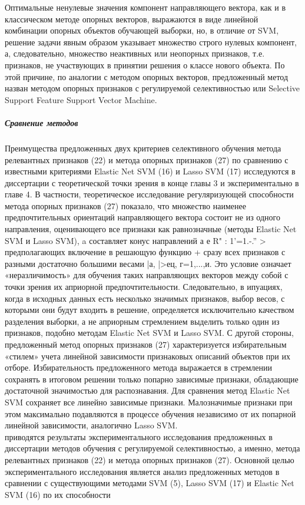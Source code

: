 \documentclass[../body.tex]{subfiles}
\begin{document}
{Оптимальные ненулевые значения компонент направляющего вектора, как и в классическом методе опорных векторов, выражаются в виде линейной комбинации опорных объектов обучающей выборки, но, в отличие от SVM, решение задачи явным образом указывает множество строго нулевых компонент, а, следовательно, множество неактивных или неопорных признаков, т.е. признаков, не участвующих
в принятии решения о классе нового объекта. По этой причине, по аналогии с методом
опорных векторов, предложенный метод назван  методом опорных признаков
с регулируемой селективностью или Selective Support Feature Support Vector Machine. 

\subparagraph{Сравнение методов}
Преимущества предложенных двух критериев селективного обучения метода релевантных признаков (22) и метода опорных признаков (27) по сравнению с известными критериями Elastic Net SVM (16) и Lasso SVM (17) исследуются в диссертации с теоретической точки зрения в конце главы 3 и экспериментально в главе 4.
В частности, теоретическое исследование регуляризующей способности метода опорных признаков (27) показало, что множество наименее предпочтительных ориентаций
направляющего вектора состоит не из одного направления, оценивающего все признаки
как равнозначные (методы Elastic Net SVM и Lasso SVM), a составляет конус направлений
{а е R" : 1'=1.-.'' } > предполагающих включение в решающую функцию
+ сразу всех признаков с разными достаточно большими весами |а, |>ец, г=1,...,и.
Это условие означает «неразличимость» для обучения таких направляющих векторов между собой с точки зрения их априорной предпочтительности. Следовательно, в ипуациях,
когда в исходных данных есть несколько значимых признаков, выбор весов, с которыми
они будут входить в решение, определяется исключительно качеством разделения выборки, а не априорным стремлением выделить только один из признаков, подобно методам
Elastic Net SVM и Lasso SVM.
С другой стороны, предложенный метод опорных признаков (27) характеризуется избирательным «стилем» учета линейной зависимости признаковых описаний объектов при
их отборе. Избирательность предложенного метода выражается в стремлении сохранять в
итоговом решении только попарно зависимые признаки, обладающие достаточной значимостью для распознавания. Для сравнения метод Elastic Net SVM сохраняет все линейно
зависимые признаки. Малозначимые признаки при этом максимально подавляются в процессе обучения независимо от их попарной линейной зависимости, аналогично Lasso SVM.
\\
 приводятся результаты экспериментального исследования предложенных в диссертации методов обучения с регулируемой селективностью, а именно, метода релевантных признаков (22) и метода опорных признаков (27). Основной целью экспериментального исследования является анализ предложенных методов в сравнении с существующими методами SVM (5), Lasso SVM (17) и Elastic Net SVM (16) по их способности
}
\end{document}
